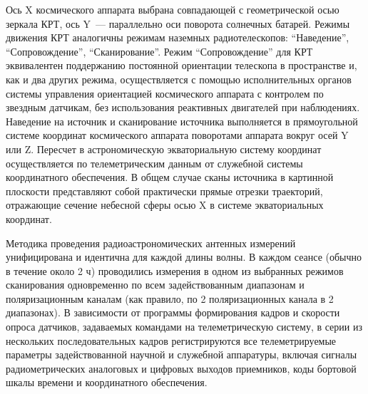 Ось X космического аппарата выбрана совпадающей с
геометрической осью зеркала КРТ, ось Y~--- параллельно оси поворота солнечных батарей. Режимы
движения КРТ аналогичны режимам наземных радиотелескопов: ``Наведение'', ``Сопровождение'',
``Сканирование''. Режим ``Сопровождение'' для КРТ эквивалентен поддержанию постоянной
ориентации телескопа в пространстве и, как и два других режима, осуществляется с помощью
исполнительных органов системы управления ориентацией космического аппарата с контролем по
звездным датчикам, без использования реактивных двигателей при наблюдениях.
Наведение на источник и сканирование источника выполняется в прямоугольной системе координат
космического аппарата поворотами аппарата вокруг осей Y или Z. Пересчет в астрономическую
экваториальную систему координат осуществляется по телеметрическим данным от служебной системы
координатного обеспечения. В общем случае сканы источника в картинной плоскости представляют собой
практически прямые отрезки траекторий, отражающие сечение небесной сферы осью X
в системе экваториальных координат.

Методика проведения радиоастрономических антенных измерений унифицирована и идентична для каждой
длины волны. В каждом сеансе (обычно в течение около 2 ч) проводились измерения в одном из выбранных
режимов сканирования одновременно по всем задействованным диапазонам и поляризационным каналам (как
правило, по 2 поляризационных канала в 2 диапазонах). В зависимости от программы формирования кадров
и скорости опроса датчиков, задаваемых командами на телеметрическую систему, в серии из нескольких
последовательных кадров регистрируются все телеметрируемые параметры задействованной научной и
служебной аппаратуры, включая сигналы радиометрических аналоговых и цифровых выходов приемников,
коды бортовой шкалы времени и координатного обеспечения.


